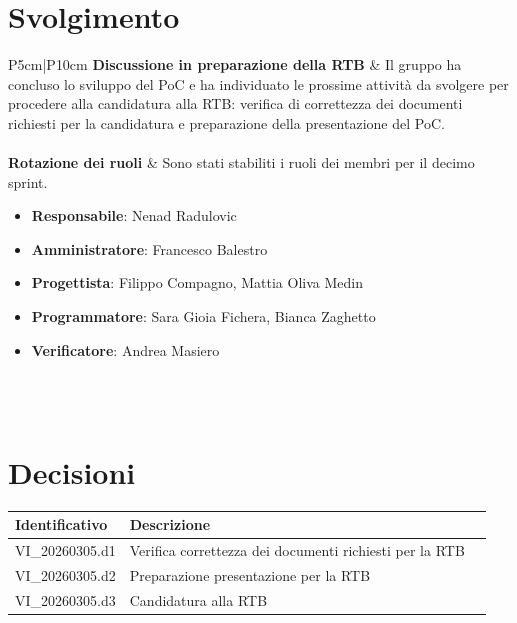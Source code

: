 \documentclass[a4paper,12pt]{article}
\begin{document}
    \section{Svolgimento} {
        \begin{longtable}{P{5cm}|P{10cm}} 
            \textbf{Discussione in preparazione della RTB} & Il gruppo ha concluso lo sviluppo del PoC e ha individuato le prossime attività da svolgere per procedere alla candidatura alla RTB: verifica di correttezza dei documenti richiesti per la candidatura e preparazione della presentazione del PoC.\\\\
            \textbf{Rotazione dei ruoli} & Sono stati stabiliti i ruoli dei membri per il decimo sprint.
            \begin{itemize}
                \item \textbf{Responsabile}:  Nenad Radulovic
                \item \textbf{Amministratore}: Francesco Balestro
                \item \textbf{Progettista}: Filippo Compagno, Mattia Oliva Medin
                \item \textbf{Programmatore}: Sara Gioia Fichera, Bianca Zaghetto
                \item \textbf{Verificatore}: Andrea Masiero
            \end{itemize}\\\\
        \end{longtable}
    }

    \section{Decisioni} {
        \begin{tabularx}{\textwidth}{|l|X|l|}
            \hline
            \textbf{Identificativo} & \textbf{Descrizione}\\
            \hline
            VI\_20260305.d1 & Verifica correttezza dei documenti richiesti per la RTB\\
            \hline
            VI\_20260305.d2 & Preparazione presentazione per la RTB\\
            \hline
            VI\_20260305.d3 & Candidatura alla RTB\\
            \hline
        \end{tabularx}
    }
\end{document}

